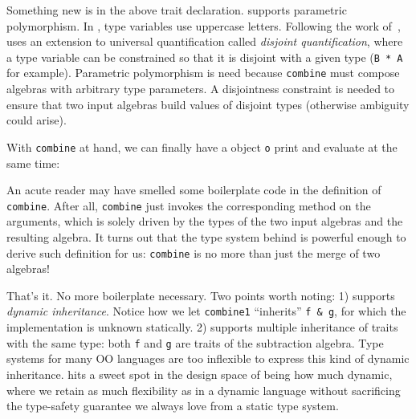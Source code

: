 Something new is in the above trait declaration. \name supports parametric
polymorphism. In \name, type variables use uppercase letters. Following the work
of~\citet{alpuimdisjoint}, \name uses an extension to universal quantification
called \textit{disjoint quantification}, where a type variable can be
constrained so that it is disjoint with a given type (\lstinline{B * A} for
example). Parametric polymorphism is need because \lstinline{combine} must
compose algebras with arbitrary type parameters. A disjointness constraint is
needed to ensure that two input algebras build values of disjoint types
(otherwise ambiguity could arise).

With \lstinline{combine} at hand, we can finally have a object \lstinline{o}
print and evaluate at the same time:


An acute reader may have smelled some boilerplate code in the definition of
\lstinline{combine}. After all, \lstinline{combine} just invokes the
corresponding method on the arguments, which is solely driven by the types of
the two input algebras and the resulting algebra. It turns out that the type
system behind \name is powerful enough to derive such definition for us:
\lstinline{combine} is no more than just the merge of two algebras!


That's it. No more boilerplate necessary. Two points worth noting: 1) \name
supports \textit{dynamic inheritance}. Notice how we let \lstinline{combine1}
``inherits'' \lstinline{f & g}, for which the implementation is unknown
statically. 2) \name supports multiple inheritance of traits with the same type:
both \lstinline{f} and \lstinline{g} are traits of the subtraction algebra. Type
systems for many OO languages are too inflexible to express this kind of dynamic
inheritance. \name hits a sweet spot in the design space of being how much
dynamic, where we retain as much flexibility as in a dynamic language without
sacrificing the type-safety guarantee we always love from a static type system.
